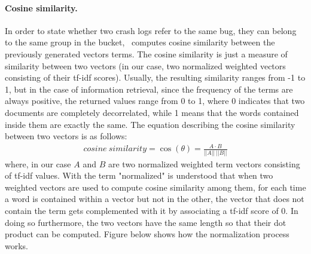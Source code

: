 \paragraph{Cosine similarity.} 
In order to state whether two crash logs refer to the same bug, \ie they can belong to the same group in the bucket, \toolname\ computes cosine similarity between the previously generated vectors terms. 
The cosine similarity is just a measure of similarity between two vectors \cite{cosine} (in our case, two normalized weighted vectors consisting of their tf-idf scores).
Usually, the resulting similarity ranges from -1 to 1, but in the case of information retrieval, since the frequency of the terms are always positive, the returned values range from 0 to 1, where 0 indicates that two documents are completely decorrelated, while 1 means that the words contained inside them are exactly the same.  
The equation describing the cosine similarity between two vectors is as follows: 
\begin{align*}
cosine\:similarity = \cos({\theta}) = \frac{A\cdot{B}}{||A||\:||B||}
\end{align*}
where, in our case $A$ and $B$ are two normalized weighted term vectors consisting of tf-idf values. 
With the term "normalized" is understood that when two weighted vectors are used to compute cosine similarity among them, for each time a word is contained within a vector but not in the other, the vector that does not contain the term gets complemented with it by associating a tf-idf score of 0. In doing so furthermore, the two vectors have the same length so that their dot product can be computed.
Figure below shows how the normalization process works. 

